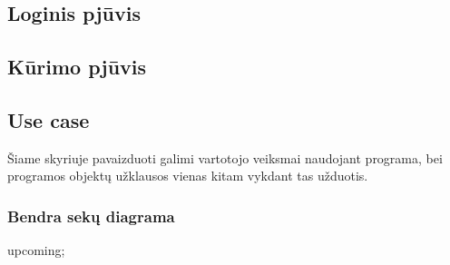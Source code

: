 \documentclass[oneside]{VUMIFPSkursinis}
\begin{document}
\subsection{Loginis pjūvis}
\subsection{Kūrimo pjūvis}
\subsection{Use case}
Šiame skyriuje pavaizduoti galimi vartotojo veiksmai naudojant programa, bei programos objektų užklausos vienas kitam vykdant tas užduotis.
\subsubsection{Bendra sekų diagrama}
upcoming;
\end{document}
